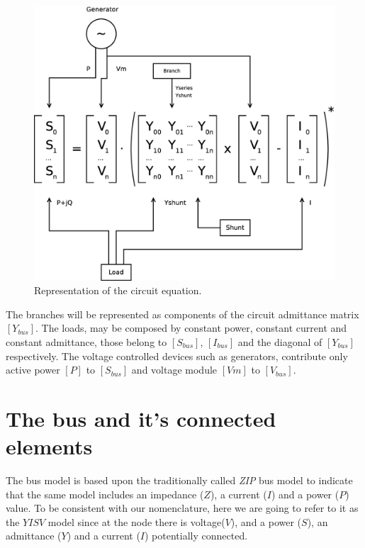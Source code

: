 \documentclass[nols,a4paper,twoside,symmetric,notoc,fleqn]{tufte-book}
\begin{document}
\begin{figure}[h!]
	\includegraphics[width=0.9\linewidth]{img/CircuitEquation.eps}
	\caption{Representation of the circuit equation.}
	\label{fig:circuit_equation}
\end{figure}

The branches will be represented as components of the circuit admittance matrix $[Y_{bus}]$. The loads, may be composed by constant power, constant current and constant admittance, those belong to $[S_{bus}]$, $[I_{bus}]$ and the diagonal of $[Y_{bus}]$ respectively. The voltage controlled devices such as generators, contribute only active power $[P]$ to $[S_{bus}]$ and voltage module $[Vm]$ to $[V_{bus}]$.

\section{The bus and it's connected elements}

The bus model is based upon the traditionally called \textit{ZIP} bus model to indicate that the same model includes an impedance ($Z$), a current ($I$) and a power ($P$) value. To be consistent with our nomenclature, here we are going to refer to it as the $YISV$ model since at the node there is voltage($V$), and a power ($S$), an admittance ($Y$) and a current ($I$) potentially connected.


\end{document}
